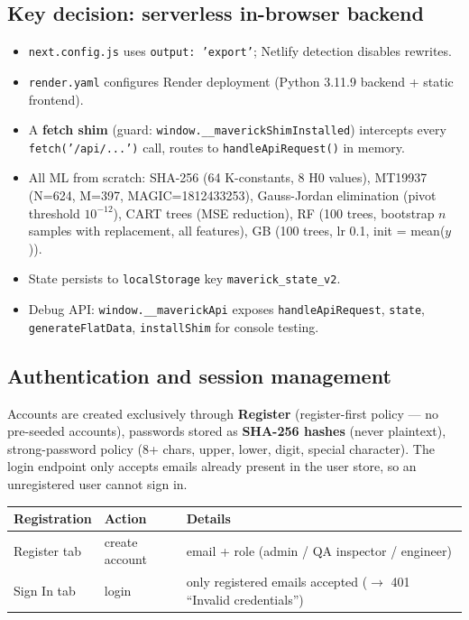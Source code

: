 \documentclass[11pt,a4paper]{article}
\newcommand{\code}[1]{\texttt{\small #1}}
\newcommand{\keys}[1]{\textbf{\sffamily#1}}
\begin{document}
\subsection*{Key decision: serverless in-browser backend}
\begin{itemize}[leftmargin=1.5em]
  \item \code{next.config.js} uses \code{output: 'export'}; Netlify detection disables rewrites.
  \item \code{render.yaml} configures Render deployment (Python 3.11.9 backend + static frontend).
  \item A \textbf{fetch shim} (guard: \code{window.\_\_maverickShimInstalled}) intercepts every
        \code{fetch('/api/...')} call, routes to \code{handleApiRequest()} in memory.
  \item All ML from scratch: SHA-256 (64 K-constants, 8 H0 values), MT19937 (N=624, M=397,
        MAGIC=1812433253), Gauss-Jordan elimination (pivot threshold $10^{-12}$), CART trees
        (MSE reduction), RF (100 trees, bootstrap $n$ samples with replacement, all features),
        GB (100 trees, lr 0.1, init = mean($y$)).
  \item State persists to \code{localStorage} key \code{maverick\_state\_v2}.
  \item Debug API: \code{window.\_\_maverickApi} exposes \code{handleApiRequest}, \code{state},
        \code{generateFlatData}, \code{installShim} for console testing.
\end{itemize}

\subsection*{Authentication and session management}
Accounts are created exclusively through \keys{Register} (register-first policy --- no pre-seeded
accounts), passwords stored as \textbf{SHA-256 hashes} (never plaintext), strong-password
policy (8+ chars, upper, lower, digit, special character). The login endpoint only accepts
emails already present in the user store, so an unregistered user cannot sign in.

\begin{center}
\begin{tabular}{@{}lll@{}}
\toprule
\textbf{Registration} & \textbf{Action} & \textbf{Details}\\
\midrule
Register tab & create account & email + role (admin / QA inspector / engineer)\\
Sign In tab & login & only registered emails accepted ($\rightarrow$ 401 ``Invalid credentials'')\\
\bottomrule
\end{tabular}
\end{center}
\end{document}
